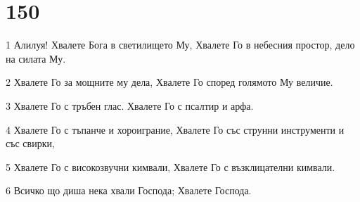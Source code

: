 \chapter{150}

\par 1 Алилуя! Хвалете Бога в светилището Му, Хвалете Го в небесния простор, дело на силата Му.
\par 2 Хвалете Го за мощните му дела, Хвалете Го според голямото Му величие.
\par 3 Хвалете Го с тръбен глас. Хвалете Го с псалтир и арфа.
\par 4 Хвалете Го с тъпанче и хороиграние, Хвалете Го със струнни инструменти и със свирки,
\par 5 Хвалете Го с високозвучни кимвали, Хвалете Го с възклицателни кимвали.
\par 6 Всичко що диша нека хвали Господа; Хвалете Господа.

